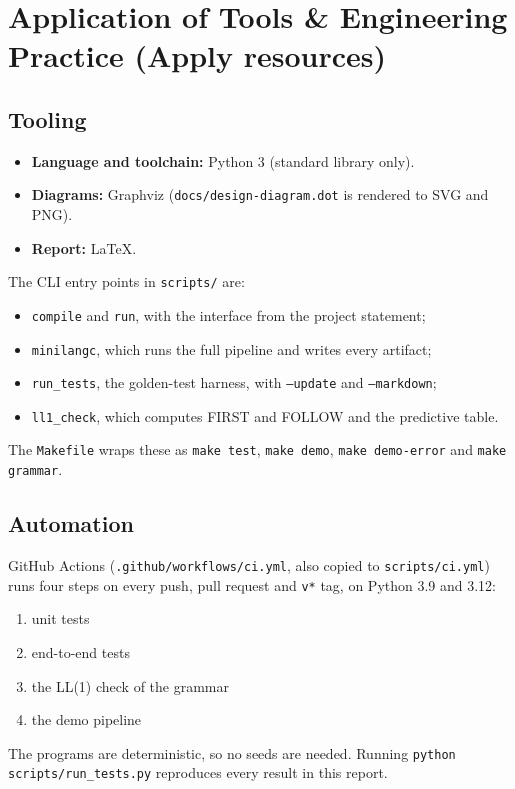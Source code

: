 \documentclass[11pt,letterpaper]{article}
\newcommand{\code}[1]{\texttt{#1}}
\begin{document}
\section{Application of Tools \& Engineering Practice \textmd{(Apply resources)}}

\subsection{Tooling}
\begin{itemize}
  \item \textbf{Language and toolchain:} Python 3 (standard library only).
  \item \textbf{Diagrams:} Graphviz (\code{docs/design-diagram.dot} is rendered to SVG and PNG).
  \item \textbf{Report:} \LaTeX.
\end{itemize}
The CLI entry points in \code{scripts/} are:
\begin{itemize}
  \item \code{compile} and \code{run}, with the interface from the project statement;
  \item \code{minilangc}, which runs the full pipeline and writes every artifact;
  \item \code{run\_tests}, the golden-test harness, with \code{--update} and \code{--markdown};
  \item \code{ll1\_check}, which computes FIRST and FOLLOW and the predictive table.
\end{itemize}
The \code{Makefile} wraps these as \code{make test}, \code{make demo}, \code{make demo-error} and \code{make grammar}.

\subsection{Automation}
GitHub Actions (\code{.github/workflows/ci.yml}, also copied to \code{scripts/ci.yml}) runs four steps on every push, pull request and \code{v*} tag, on Python 3.9 and 3.12:
\begin{enumerate}
  \item unit tests
  \item end-to-end tests
  \item the LL(1) check of the grammar
  \item the demo pipeline
\end{enumerate}
The programs are deterministic, so no seeds are needed. Running \code{python scripts/run\_tests.py} reproduces every result in this report.
\end{document}
